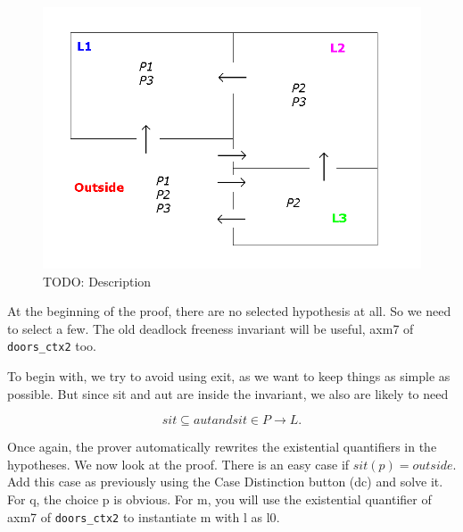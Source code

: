 \begin{figure}[!h]
\begin{center}
	\includegraphics[]{img/tutorial/tut_10_graph.png}
	\caption{TODO: Description}
	\label{fig_tut_10_graph}
\end{center}
\end{figure}

At the beginning of the proof, there are no selected hypothesis at all. So we need to select a few. The old deadlock freeness invariant will be useful, \textsf{axm7} of \texttt{doors\_ctx2} too. 

\begin{description}
\AXIOMS
	\begin{description}
	\end{description}
\end{description}

To begin with, we try to avoid using \textsf{exit}, as we want to keep things as simple as possible. But since \textsf{sit} and \textsf{aut} are inside the invariant, we also are likely to need 

\[
sit \subseteq aut and sit \in P \mathbin \rightarrow L.
\]

Once again, the prover automatically rewrites the existential quantifiers in the hypotheses. We now look at the proof. There is an easy case if $sit(p) = outside$. Add this case as previously using the \textsf{Case Distinction button (dc)} and solve it. For \textsf{q}, the choice \textsf{p} is obvious. For \textsf{m}, you will use the existential quantifier of \textsf{axm7} of \texttt{doors\_ctx2} to instantiate \textsf{m} with \textsf{l} as \textsf{l0}. 

